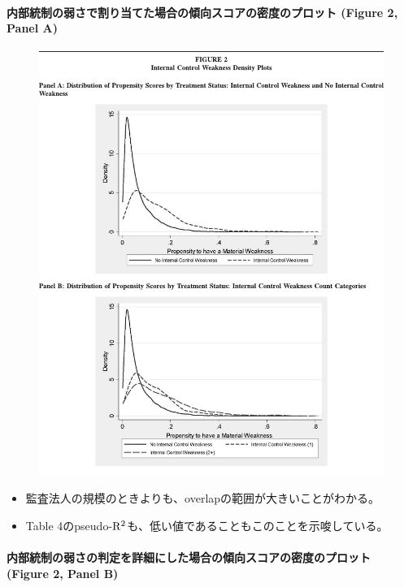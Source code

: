 \paragraph{内部統制の弱さで割り当てた場合の傾向スコアの密度のプロット (Figure 2, Panel A) }

\begin{figure}
 \centering
 \includegraphics[width=16cm]{../fig/fig02.pdf}
\end{figure}

\begin{itemize}
 \item 監査法人の規模のときよりも、overlapの範囲が大きいことがわかる。
 \item Table 4のpseudo-${\rm R^2}$も、低い値であることもこのことを示唆している。
\end{itemize}

\paragraph{内部統制の弱さの判定を詳細にした場合の傾向スコアの密度のプロット (Figure 2, Panel B) }

